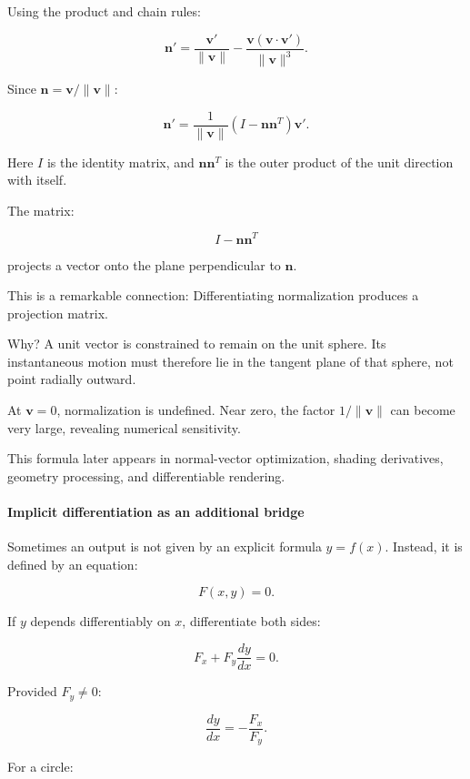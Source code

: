 Using the product and chain rules:

\[
\mathbf n' = \frac{\mathbf v'}{\|\mathbf v\|} - \frac{\mathbf v(\mathbf v\cdot\mathbf v')}{\|\mathbf v\|^3}.
\]

Since \(\mathbf n=\mathbf v/\|\mathbf v\|\):

\[
\boxed{ \mathbf n' = \frac1{\|\mathbf v\|} \left(I-\mathbf n\mathbf n^T\right)\mathbf v' }.
\]

Here \(I\) is the identity matrix, and \(\mathbf n\mathbf n^T\) is the outer product of the unit direction with itself.

The matrix:

\[
I-\mathbf n\mathbf n^T
\]

projects a vector onto the plane perpendicular to \(\mathbf n\).

This is a remarkable connection: Differentiating normalization produces a projection matrix.

Why? A unit vector is constrained to remain on the unit sphere. Its instantaneous motion must therefore lie in the tangent plane of that sphere, not point radially outward.

At \(\mathbf v=0\), normalization is undefined. Near zero, the factor \(1/\|\mathbf v\|\) can become very large, revealing numerical sensitivity.

This formula later appears in normal-vector optimization, shading derivatives, geometry processing, and differentiable rendering.

\paragraph{Implicit differentiation as an additional bridge}\label{02-foundations-ii-ch021-implicit-differentiation-as-an-additional-bridge}

\hypertarget{02-foundations-ii-ch021-implicit-differentiation-as-an-additional-bridge}{}

Sometimes an output is not given by an explicit formula \(y=f(x)\). Instead, it is defined by an equation:

\[
F(x,y)=0.
\]

If \(y\) depends differentiably on \(x\), differentiate both sides:

\[
F_x+F_y\frac{dy}{dx}=0.
\]

Provided \(F_y\ne0\):

\[
\boxed{\frac{dy}{dx}=-\frac{F_x}{F_y}}.
\]

For a circle:

